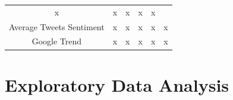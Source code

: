 \documentclass[12pt,oneside]{chicagocapstone}
\begin{document}
\begin{longtable}[]{@{}cccccc@{}}
\begin{minipage}[t]{0.10\columnwidth}
x\strut
\end{minipage} & \begin{minipage}[t]{0.11\columnwidth}\centering
x\strut
\end{minipage} & \begin{minipage}[t]{0.13\columnwidth}\centering
x\strut
\end{minipage} & \begin{minipage}[t]{0.13\columnwidth}\centering
x\strut
\end{minipage} & \begin{minipage}[t]{0.13\columnwidth}\centering
x\strut
\end{minipage}\tabularnewline
\begin{minipage}[t]{0.22\columnwidth}\centering
Average Tweets Sentiment\strut
\end{minipage} & \begin{minipage}[t]{0.10\columnwidth}\centering
x\strut
\end{minipage} & \begin{minipage}[t]{0.11\columnwidth}\centering
x\strut
\end{minipage} & \begin{minipage}[t]{0.13\columnwidth}\centering
x\strut
\end{minipage} & \begin{minipage}[t]{0.13\columnwidth}\centering
x\strut
\end{minipage} & \begin{minipage}[t]{0.13\columnwidth}\centering
x\strut
\end{minipage}\tabularnewline
\begin{minipage}[t]{0.22\columnwidth}\centering
Google Trend\strut
\end{minipage} & \begin{minipage}[t]{0.10\columnwidth}\centering
x\strut
\end{minipage} & \begin{minipage}[t]{0.11\columnwidth}\centering
x\strut
\end{minipage} & \begin{minipage}[t]{0.13\columnwidth}\centering
x\strut
\end{minipage} & \begin{minipage}[t]{0.13\columnwidth}\centering
x\strut
\end{minipage} & \begin{minipage}[t]{0.13\columnwidth}\centering
x\strut
\end{minipage}\tabularnewline
\bottomrule
\end{longtable}
\hypertarget{methodology-descriptive}{%
\section*{Exploratory Data Analysis}\label{methodology-descriptive}}
\end{document}
